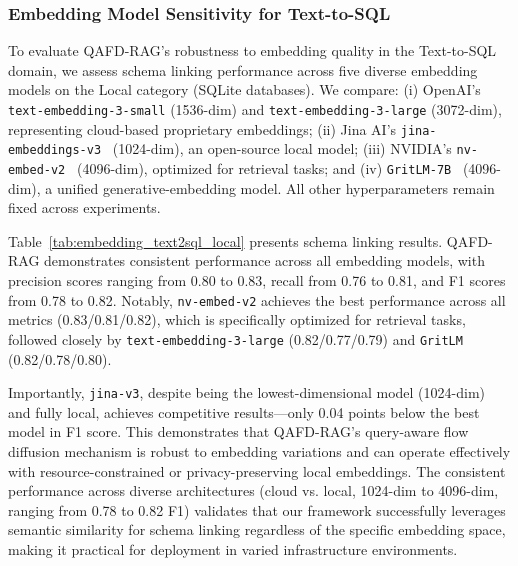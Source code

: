 \documentclass{article} %
\begin{document}
\subsubsection{{Embedding Model Sensitivity for Text-to-SQL}}
\label{sec:embedding_sensitivity_text2sql}
{
To evaluate QAFD-RAG's robustness to embedding quality in the Text-to-SQL domain, we assess schema linking performance across five diverse embedding models on the Local category (SQLite databases). We compare: (i) OpenAI's \texttt{text-embedding-3-small} (1536-dim) and \texttt{text-embedding-3-large} (3072-dim), representing cloud-based proprietary embeddings; (ii) Jina AI's \texttt{jina-embeddings-v3}~\citep{sturua2024jina} (1024-dim), an open-source local model; (iii) NVIDIA's \texttt{nv-embed-v2}~\citep{lee2024nv} (4096-dim), optimized for retrieval tasks; and (iv) \texttt{GritLM-7B}~\citep{muennighoff2024generative} (4096-dim), a unified generative-embedding model. All other hyperparameters remain fixed across experiments.

Table~\ref{tab:embedding_text2sql_local} presents schema linking results. QAFD-RAG demonstrates consistent performance across all embedding models, with precision scores ranging from 0.80 to 0.83, recall from 0.76 to 0.81, and F1 scores from 0.78 to 0.82. Notably, \texttt{nv-embed-v2} achieves the best performance across all metrics (0.83/0.81/0.82), which is specifically optimized for retrieval tasks, followed closely by \texttt{text-embedding-3-large} (0.82/0.77/0.79) and \texttt{GritLM} (0.82/0.78/0.80).

Importantly, \texttt{jina-v3}, despite being the lowest-dimensional model (1024-dim) and fully local, achieves competitive results—only 0.04 points below the best model in F1 score. This demonstrates that QAFD-RAG's query-aware flow diffusion mechanism is robust to embedding variations and can operate effectively with resource-constrained or privacy-preserving local embeddings. The consistent performance across diverse architectures (cloud vs. local, 1024-dim to 4096-dim, ranging from 0.78 to 0.82 F1) validates that our framework successfully leverages semantic similarity for schema linking regardless of the specific embedding space, making it practical for deployment in varied infrastructure environments.
}
\end{document}
